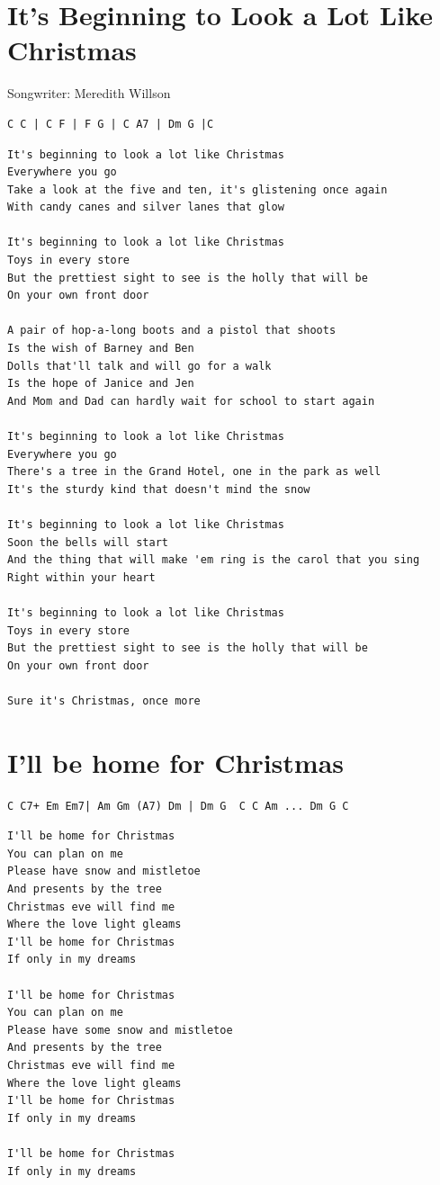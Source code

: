 \documentclass[
]{article}
\begin{document}
\hypertarget{its-beginning-to-look-a-lot-like-christmas}{%
\section{It's Beginning to Look a Lot Like
Christmas}\label{its-beginning-to-look-a-lot-like-christmas}}

Songwriter: Meredith Willson

\begin{verbatim}
C C | C F | F G | C A7 | Dm G |C
\end{verbatim}

\begin{verbatim}
It's beginning to look a lot like Christmas
Everywhere you go
Take a look at the five and ten, it's glistening once again
With candy canes and silver lanes that glow

It's beginning to look a lot like Christmas
Toys in every store
But the prettiest sight to see is the holly that will be
On your own front door

A pair of hop-a-long boots and a pistol that shoots
Is the wish of Barney and Ben
Dolls that'll talk and will go for a walk
Is the hope of Janice and Jen
And Mom and Dad can hardly wait for school to start again

It's beginning to look a lot like Christmas
Everywhere you go
There's a tree in the Grand Hotel, one in the park as well
It's the sturdy kind that doesn't mind the snow

It's beginning to look a lot like Christmas
Soon the bells will start
And the thing that will make 'em ring is the carol that you sing
Right within your heart

It's beginning to look a lot like Christmas
Toys in every store
But the prettiest sight to see is the holly that will be
On your own front door

Sure it's Christmas, once more
\end{verbatim}

\hypertarget{ill-be-home-for-christmas}{%
\section{I'll be home for Christmas}\label{ill-be-home-for-christmas}}

\begin{verbatim}
C C7+ Em Em7| Am Gm (A7) Dm | Dm G  C C Am ... Dm G C
\end{verbatim}

\begin{verbatim}
I'll be home for Christmas
You can plan on me
Please have snow and mistletoe
And presents by the tree
Christmas eve will find me
Where the love light gleams
I'll be home for Christmas
If only in my dreams

I'll be home for Christmas
You can plan on me
Please have some snow and mistletoe
And presents by the tree
Christmas eve will find me
Where the love light gleams
I'll be home for Christmas
If only in my dreams

I'll be home for Christmas
If only in my dreams
\end{verbatim}
\end{document}
